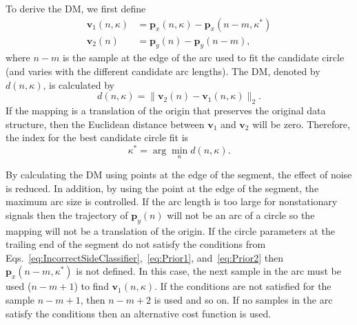\documentclass[journal,11pt,a4paper,onecolumn,draftcls]{IEEEtran}
\begin{document}
To derive the DM, we first define
\begin{align}
	\mathbf{v}_1\left( n,\kappa \right) &= \mathbf{p}_x(n,\kappa)-\mathbf{p}_x(n-m,\kappa^*) \label{v1} \\
	\mathbf{v}_2\left( n \right) &= \mathbf{p}_y(n)-\mathbf{p}_y(n-m), \label{v2}
\end{align}
where $n-m$ is the sample at the edge of the arc used to fit the candidate circle (and varies with the different candidate arc lengths). The DM, denoted by $d\left( {n,\kappa} \right)$, is calculated by
\begin{equation}\label{eq:relative_distance_mismatch}
    d\left( {n,\kappa} \right) = \|\mathbf{v}_2\left( n \right)-\mathbf{v}_1\left( n,\kappa \right)\|_2.
\end{equation}
If the mapping is a translation of the origin that preserves the original data structure, then the Euclidean distance between $\mathbf{v}_1$ and $\mathbf{v}_2$ will be zero. Therefore, the index for the best candidate circle fit is
\begin{equation}\label{Kappa_star}
\kappa^* = \arg \mathop{\min} \limits_\kappa d\left( n,\kappa \right).
\end{equation}

By calculating the DM using points at the edge of the segment, the effect of noise is reduced. In addition, by using the point at the edge of the segment, the maximum arc size is controlled. If the arc length is too large for nonstationary signals then the trajectory of $\mathbf{p}_y(n)$ will not be an arc of a circle so the mapping will not be a translation of the origin. If the circle parameters at the trailing end of the segment do not satisfy the conditions from Eqs.~\ref{eq:IncorrectSideClassifier},~\ref{eq:Prior1}, and~\ref{eq:Prior2} then $\mathbf{p}_x(n-m,\kappa^*)$ is not defined. In this case, the next sample in the arc must be used ($n-m+1$) to find $\mathbf{v}_1(n,\kappa)$. If the conditions are not satisfied for the sample $n-m+1$, then $n-m+2$ is used and so on. If no samples in the arc satisfy the conditions then an alternative cost function is used. 
\end{document}
